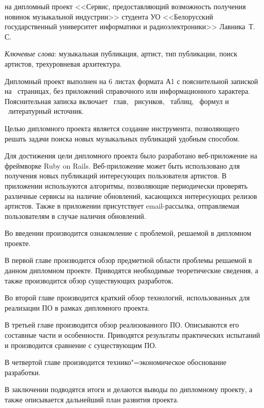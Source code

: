 \thispagestyle{empty}

\begin{center}
  \begin{minipage}{0.82\textwidth}
    на дипломный проект <<Сервис, предоставляющий возможность получения новинок музыкальной индустрии>> студента УО <<Белорусский государственный университет информатики и радиоэлектроники>> Лавника~Т.\,С.
  \end{minipage}
\end{center}

\emph{Ключевые слова}: музыкальная публикация, артист, тип публикации, поиск артистов, трехуровневая архитектура.

\vspace{4\parsep}

Дипломный проект выполнен на 6 листах формата А1 с пояснительной запиской на~\pageref*{LastPage} страницах, без приложений справочного или информационного характера.
Пояснительная записка включает ~глав, \totfig{}~рисунков, \tottab{}~таблиц, \toteq{}~формул и \totref{}~литературный источник.

Целью дипломного проекта является создание инструмента, позволяющего решать задачи поиска новых музыкальных публикаций удобным способом.

Для достижения цели дипломного проекта было разработано веб-приложение на фреймворке Ruby on Rails.
Веб-приложение может быть использовано для получения новых публикаций интересующих пользователя артистов.
В приложении используются алгоритмы, позволяющие периодически проверять различные сервисы на наличие обновлений, касающихся интересующих релизов артистов. Также в приложении присутствует email-рассылка, отправляемая пользователям в случае наличия обновлений.

Во введении производится ознакомление с проблемой, решаемой в дипломном проекте.

В первой главе производится обзор предметной области проблемы решаемой в данном дипломном проекте.
Приводятся необходимые теоретические сведения, а также производится обзор существующих разработок.

Во второй главе производится краткий обзор технологий, использованных для реализации ПО в рамках дипломного проекта.

В третьей главе производится обзор реализованного ПО.
Описываются его составные части и особенности.
Приводятся результаты практических испытаний и производится сравнение с существующим ПО.

В четвертой главе производится технико"=экономическое обоснование разработки.

В заключении подводятся итоги и делаются выводы по дипломному проекту, а также описывается дальнейший план развития проекта.

\clearpage
